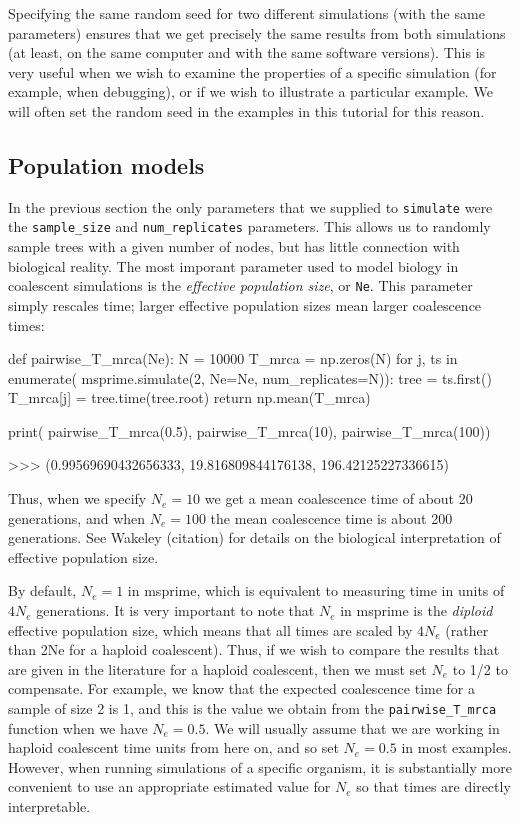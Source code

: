 \documentclass[graybox]{svmult}
\begin{document}
Specifying the same random seed for two different simulations (with the
same parameters) ensures that we get precisely the same results from
both simulations (at least, on the same computer and with the same
software versions). This is very useful when we wish to examine the
properties of a specific simulation (for example, when debugging), or if
we wish to illustrate a particular example. We will often set the random
seed in the examples in this tutorial for this reason.

\subsection{Population models}\label{population-models}

In the previous section the only parameters that we supplied to
\texttt{simulate} were the \texttt{sample\_size} and
\texttt{num\_replicates} parameters. This allows us to randomly sample
trees with a given number of nodes, but has little connection with
biological reality. The most imporant parameter used to model biology in
coalescent simulations is the \emph{effective population size}, or
\texttt{Ne}. This parameter simply rescales time; larger effective
population sizes mean larger coalescence times:

\begin{pythoncode}
def pairwise_T_mrca(Ne):
    N = 10000
    T_mrca = np.zeros(N)
    for j, ts in enumerate(
            msprime.simulate(2, Ne=Ne, num_replicates=N)):
        tree = ts.first()
        T_mrca[j] = tree.time(tree.root)
    return np.mean(T_mrca)

print(
    pairwise_T_mrca(0.5), pairwise_T_mrca(10),
    pairwise_T_mrca(100))

>>> (0.99569690432656333, 19.816809844176138, 196.42125227336615)
\end{pythoncode}

    Thus, when we specify \(N_e=10\) we get a mean coalescence time of about
20 generations, and when \(N_e=100\) the mean coalescence time is about
200 generations. See Wakeley (citation) for details on the biological
interpretation of effective population size.

By default, \(N_e = 1\) in msprime, which is equivalent to measuring
time in units of \(4N_e\) generations. It is very important to note that
\(N_e\) in msprime is the \emph{diploid} effective population size,
which means that all times are scaled by \(4N_e\) (rather than 2Ne for a
haploid coalescent). Thus, if we wish to compare the results that are
given in the literature for a haploid coalescent, then we must set
\(N_e\) to 1/2 to compensate. For example, we know that the expected
coalescence time for a sample of size 2 is 1, and this is the value we
obtain from the \texttt{pairwise\_T\_mrca} function when we have
\(N_e=0.5\). We will usually assume that we are working in haploid
coalescent time units from here on, and so set \(N_e=0.5\) in most
examples. However, when running simulations of a specific organism, it
is substantially more convenient to use an appropriate estimated value
for \(N_e\) so that times are directly interpretable.
\end{document}

